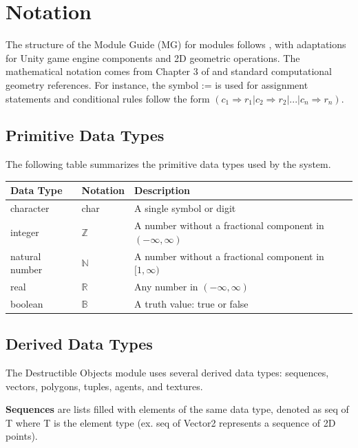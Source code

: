 \documentclass[12pt, titlepage]{article}
\begin{document}
\section{Notation}\label{SecNotation}

The structure of the Module Guide (MG) for modules follows \cite{Parnas1984},
with adaptations for Unity game engine components and 2D geometric operations.
The mathematical notation comes from Chapter 3 of \cite{Parnas1984} and
standard computational geometry references. For instance, the symbol := is used for
assignment statements and conditional rules follow the form
\newline
$(c_1 \Rightarrow r_1 | c_2 \Rightarrow r_2 | ... | c_n \Rightarrow r_n)$.

\subsection{Primitive Data Types}

The following table summarizes the primitive data types used by the system.

\begin{table}[h]
\centering
\begin{tabular}{lll}
\toprule
\textbf{Data Type} & \textbf{Notation} & \textbf{Description} \\
\midrule
character & char & A single symbol or digit \\
integer & $\mathbb{Z}$ & A number without a fractional component in $(-\infty, \infty)$ \\
natural number & $\mathbb{N}$ & A number without a fractional component in $[1, \infty)$ \\
real & $\mathbb{R}$ & Any number in $(-\infty, \infty)$ \\
boolean & $\mathbb{B}$ & A truth value: true or false \\
\bottomrule
\end{tabular}
\end{table}

\newpage

\subsection{Derived Data Types}

The Destructible Objects module uses several derived data types: sequences, vectors, polygons, tuples, agents, and textures.

\textbf{Sequences} are lists filled with elements of the same data type, denoted as seq of T where T is the element type (ex. seq of Vector2 represents a sequence of 2D points).
\end{document}

